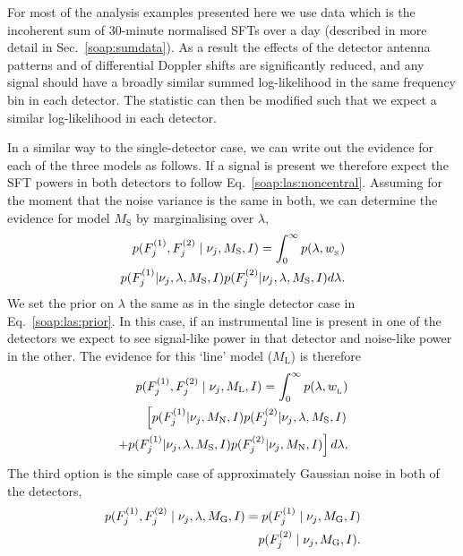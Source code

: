 %
%
For most of the analysis examples presented here we use data which is the incoherent sum of 30-minute normalised \glspl{SFT} over a day (described in more detail in Sec.~\ref{soap:sumdata}). As a result the effects of the detector antenna patterns and of differential Doppler shifts are significantly reduced, and any signal should have a broadly similar summed log-likelihood in the same frequency bin in each detector. The statistic can then be modified such that we expect a similar log-likelihood in each detector.

In a similar way to the single-detector case, we can write out the evidence for each of the three models as follows. If a signal is present we therefore expect the \gls{SFT} powers in both detectors to follow Eq.~\ref{soap:las:noncentral}.  Assuming for the moment that the noise variance is the same in both, we can determine the evidence for model $M_{\text{S}}$ by marginalising over $\lambda$,
%
\begin{equation}
\label{soap:las:signal}
\begin{split}
p(F^{(1)}_{j},F^{(2)}_{j} \mid \nu_j,M_{\rm{S}},I) = \int_0^{\infty}  p(\lambda,w_{\rm_S}) \\
p(F^{(1)}_{j}|\nu_j,\lambda,M_{\text{S}},I)p(F^{(2)}_{j}|\nu_j,\lambda,M_{\text{S}},I) d\lambda.
\end{split}
\end{equation}
%
We set the prior on $\lambda$ the same as in the single detector case in Eq.~\ref{soap:las:prior}.
In this case, if an instrumental line is present in one of the detectors we expect to see signal-like power in that detector and noise-like power in the other.  The evidence for this `line' model ($M_{\text{L}}$) is therefore
%
\begin{equation}
\label{soap:las:line}
\begin{split}
p(F^{(1)}_{j},F^{(2)}_{j} \mid \nu_j,M_{\rm{L}},I) = \int_0^{\infty}  p(\lambda,w_{\rm_L}) \\
\left[ p(F^{(1)}_{j}|\nu_j,M_{\rm{N}},I)p(F^{(2)}_{j}|\nu_j,\lambda,M_{\rm{S}},I) \right. \\
\left. + p(F^{(1)}_{j}|\nu_j,\lambda,M_{\rm{S}},I)p(F^{(2)}_{j}|\nu_j,M_{\rm{N}},I)\right]d\lambda ,
\end{split}
\end{equation}
%
The third option is the simple case of approximately Gaussian noise in both of the detectors,
%
\begin{equation}
\label{soap:las:noise}
\begin{split}
p(F^{(1)}_{j},F^{(2)}_{j} \mid \nu_j,\lambda,M_{\rm{G}},I) = p(F^{(1)}_{j} \mid \nu_j,M_{\rm{G}},I) \\
p(F^{(2)}_{j} \mid \nu_j,M_{\rm{G}},I) .
\end{split}
\end{equation}

